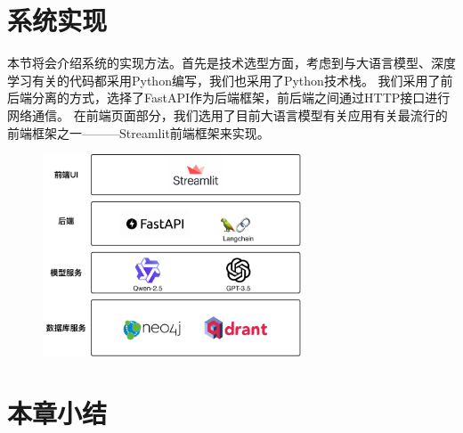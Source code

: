 \section{系统实现}

本节将会介绍系统的实现方法。首先是技术选型方面，考虑到与大语言模型、深度学习有关的代码都采用Python编写，我们也采用了Python技术栈。
我们采用了前后端分离的方式，选择了FastAPI作为后端框架，前后端之间通过HTTP接口进行网络通信。
在前端页面部分，我们选用了目前大语言模型有关应用有关最流行的前端框架之一———Streamlit前端框架来实现。

\begin{figure}[!htp]
  \vspace{1em}
  \centering
  \setlength{\abovecaptionskip}{10pt} %
  \includegraphics[height=6cm]{../assets/ch5-系统实现图.pdf}
  \label{fig:implementation}
\end{figure}


\section{本章小结}